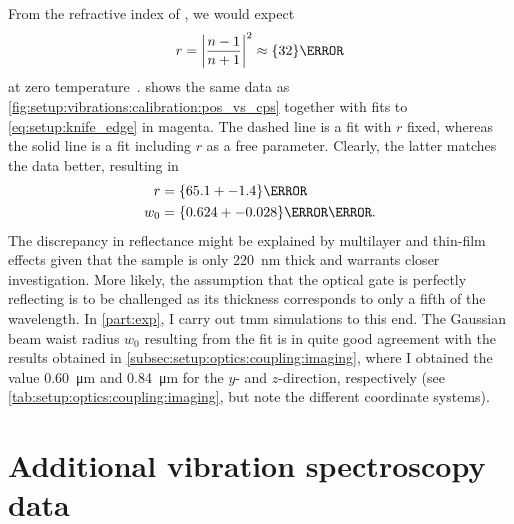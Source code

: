 From the refractive index of , we would expect
\begin{equation}
    r = \abs{\frac{n-1}{n+1}}^2 \approx \qty{32}{\percent}
\end{equation}
at zero temperature~\cite{Talghader1995}.
 shows the same data as \cref{fig:setup:vibrations:calibration:pos_vs_cps} together with fits to \cref{eq:setup:knife_edge} in magenta.
The dashed line is a fit with $r$ fixed, whereas the solid line is a fit including $r$ as a free parameter.
Clearly, the latter matches the data better, resulting in
\begin{align}
    r &= \qty{65.1+-1.4}{\percent} \\
    w_0 &= \qty{0.624+-0.028}{\micro\meter}.
\end{align}
The discrepancy in reflectance might be explained by multilayer and thin-film effects given that the sample is only \qty{220}{\nano\meter} thick and warrants closer investigation.
More likely, the assumption that the  optical gate is perfectly reflecting is to be challenged as its thickness corresponds to only a fifth of the wavelength.
In \cref{part:exp}, I carry out \gls{tmm} simulations to this end.
The Gaussian beam waist radius $w_0$ resulting from the fit is in quite good agreement with the results obtained in \cref{subsec:setup:optics:coupling:imaging}, where I obtained the value \qty{0.60}{\micro\meter} and \qty{0.84}{\micro\meter} for the $y$- and $z$-direction, respectively (see \cref{tab:setup:optics:coupling:imaging}, but note the different coordinate systems).

\section{Additional vibration spectroscopy data}\label{sec:app:setup:vibrations:data}
